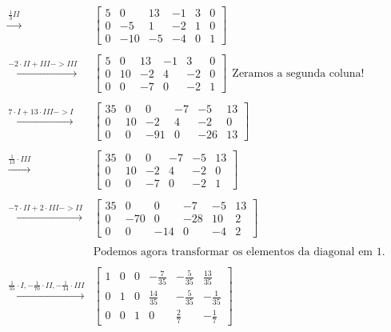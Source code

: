 \documentclass[
  portuguese,
  letterpaper,
  DIV=11,
  numbers=noendperiod]{scrreport}
\begin{document}
\[\begin{aligned}
    \stackrel{\frac{1}{3}II}{\rightarrow}
    &
    \left[\begin{array}{ccc|ccc}
        5 & 0 & 13 & -1 & 3 & 0 \\
        0 & -5 & 1 & -2 & 1 & 0 \\
        0 & -10 & -5 & -4 & 0 & 1
    \end{array}\right] \\ \\
    \stackrel{-2\cdot II + III -> III}{\rightarrow}
    &
    \left[\begin{array}{ccc|ccc}
        5 & 0 & 13 & -1 & 3 & 0 \\
        0 & 10 & -2 & 4 & -2 & 0 \\
        0 & 0 & -7 & 0 & -2 & 1
    \end{array}\right] ~~\text{Zeramos a segunda coluna!}\\ \\
    \stackrel{7\cdot I + 13\cdot III -> I}{\rightarrow}
    &
    \left[\begin{array}{ccc|ccc}
        35 & 0 & 0 & -7 & -5 & 13 \\
        0 & 10 & -2 & 4 & -2 & 0 \\
        0 & 0 & -91 & 0 & -26 & 13
    \end{array}\right]  \\ \\
    \stackrel{\frac{1}{13}\cdot III}{\rightarrow}
    &
    \left[\begin{array}{ccc|ccc}
        35 & 0 & 0 & -7 & -5 & 13 \\
        0 & 10 & -2 & 4 & -2 & 0 \\
        0 & 0 & -7 & 0 & -2 & 1
    \end{array}\right]  \\ \\
    \stackrel{-7\cdot II + 2 \cdot III -> II}{\rightarrow}
    &
    \left[\begin{array}{ccc|ccc}
        35 & 0 & 0 & -7 & -5 & 13 \\
        0 & -70 & 0 & -28 & 10 & 2 \\
        0 & 0 & -14 & 0 & -4 & 2
    \end{array}\right]\\ \\
    &\text{Podemos agora transformar os elementos da diagonal em 1.} \\ 
    \\
    \stackrel{\frac{1}{35}\cdot I, -\frac{1}{70} \cdot II, -\frac{1}{14} \cdot III}{\rightarrow}
    &
    \left[\begin{array}{ccc|ccc}
        1 & 0 & 0 & -\frac{7}{35} & -\frac{5}{35} & \frac{13}{35} \\
        0 & 1 & 0 & \frac{14}{35} & -\frac{5}{35} & -\frac{1}{35} \\
        0 & 0 & 1 & 0 & \frac{2}{7} & -\frac{1}{7}
    \end{array}\right]
\end{aligned}
\]
\end{document}
